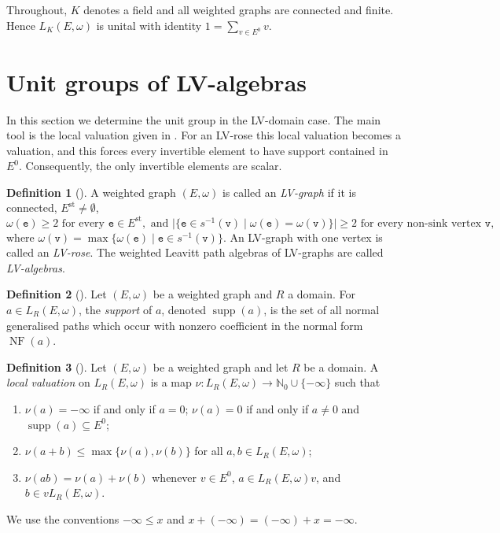 \documentclass{article}
\theoremstyle{definition}
\newtheorem{definition}{Definition}
\begin{document}
Throughout, $K$ denotes a field and all weighted graphs are connected and finite. Hence $L_K(E,\omega)$ is unital with identity $1=\sum_{v\in E^0}v$.

\section{Unit groups of LV-algebras}

In this section we determine the unit group in the LV-domain case. The main tool is the local valuation given in \cite{HaP}. For an LV-rose this local valuation becomes a valuation, and this forces every invertible element to have support contained in $E^0$. Consequently, the only invertible elements are scalar.

\begin{definition}[{\cite[Definition~38]{HaP}}]
A weighted graph $(E,\omega)$ is called an \emph{LV-graph} if it is connected,
$E^{\mathrm{st}}\neq\emptyset$, 
$$
\omega(\mathtt{e})\geq 2 \text{ for every } \mathtt{e}\in E^{\mathrm{st}}, \text{ and } \bigl|\{\mathtt{e}\in s^{-1}(\mathtt{v})\mid
\omega(\mathtt{e})=\omega(\mathtt{v})\}\bigr|\geq 2 \text{ for every non-sink vertex } \mathtt{v},
$$
where $\omega(\mathtt{v})=\max\{\omega(\mathtt{e})\mid
\mathtt{e}\in s^{-1}(\mathtt{v})\}$.
An LV-graph with one vertex is called an \emph{LV-rose}. The weighted Leavitt
path algebras of LV-graphs are called \emph{LV-algebras}.
\end{definition}

\begin{definition}[{\cite[Definition 36]{HaP}}]
Let $(E,\omega)$ be a weighted graph and $R$ a domain. For $a\in L_R(E,\omega)$, the
\emph{support} of $a$, denoted $\operatorname{supp}(a)$, is the set of all normal
generalised paths which occur with nonzero coefficient in the normal form
$\operatorname{NF}(a)$.
\end{definition}

\begin{definition}[{\cite[Definition 37]{HaP}}]\label{def:local valuation}
Let $(E,\omega)$ be a weighted graph and let $R$ be a domain. A \emph{local valuation} on $L_R(E,\omega)$
is a map $\nu:L_R(E,\omega)\to \mathbb N_0\cup\{-\infty\}$ such that
\begin{enumerate}[label=\textup{(\arabic*)}]
    \item $\nu(a)=-\infty$ if and only if $a=0$; $\nu(a)=0$ if and only if $a\neq 0$ and $\operatorname{supp}(a)\subseteq E^0$;
    \item $\nu(a+b)\leq \max\{\nu(a),\nu(b)\}$ for all $a,b\in L_R(E,\omega)$;
    \item $\nu(ab)=\nu(a)+\nu(b)$ whenever $v\in E^0$, $a\in L_R(E,\omega)v$, and $b\in vL_R(E,\omega)$.
\end{enumerate}
We use the conventions
$-\infty\leq x$ and $x+(-\infty)=(-\infty)+x=-\infty$.
\end{definition}
\end{document}
